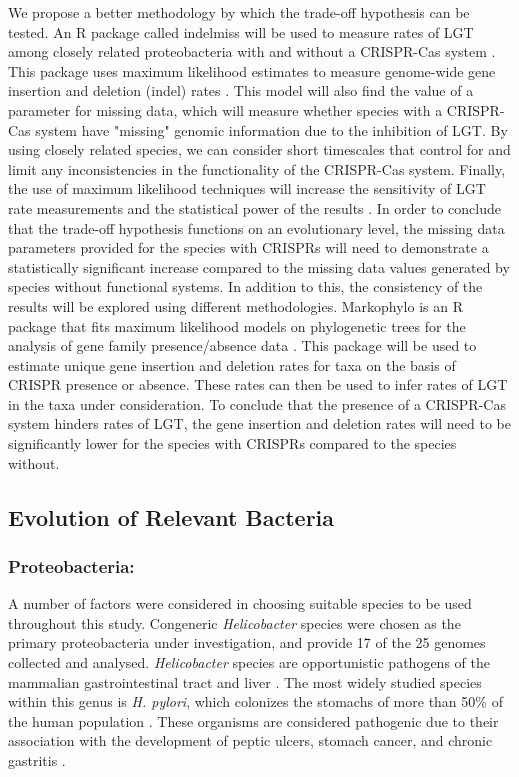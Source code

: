 \documentclass[english]{article}
\begin{document}
We propose a better methodology by which the trade-off hypothesis can
be tested. An R package called indelmiss will be used to measure rates
of LGT among closely related proteobacteria with and without a
CRISPR-Cas system \citep{Dang:15}. This package uses maximum likelihood estimates to
measure genome-wide gene insertion and deletion (indel) rates
\citep{Dang:15}. This
model will also find the value of a parameter for missing data, which
will measure whether species with a CRISPR-Cas system have "missing"
genomic information due to the inhibition of LGT. By using closely
related species, we can consider short timescales that control for and
limit any inconsistencies in the functionality of the CRISPR-Cas
system. Finally, the use of maximum likelihood techniques will
increase the sensitivity of LGT rate measurements and the statistical
power of the results \citep{Dang:15}. In order to conclude that the trade-off
hypothesis functions on an evolutionary level, the missing data
parameters provided for the species with CRISPRs will need to
demonstrate a statistically significant increase compared to the
missing data values generated by species without functional systems. 
In addition to this, the consistency of the results will be explored
 using different methodologies. Markophylo is an R package that fits
maximum likelihood models on phylogenetic trees for the analysis of
gene family presence/absence data \citep{Dang2:15}. This package will be used to
estimate unique gene insertion and deletion rates for taxa on the
basis of CRISPR presence or absence. These rates can then be used to
infer rates of LGT in the taxa under consideration. To conclude that
the presence of a CRISPR-Cas system hinders rates of LGT, the gene
insertion and deletion rates will need to be significantly lower for
the species with CRISPRs compared to the species without. 

\subsection{Evolution of Relevant Bacteria}
\subsubsection{Proteobacteria:}

A number of factors were considered in choosing suitable species to be
used throughout this study. Congeneric \textit{Helicobacter} species were
chosen as the primary proteobacteria under investigation, and provide
17 of the 25 genomes collected and analysed. \textit{Helicobacter} species are
opportunistic pathogens of the mammalian gastrointestinal tract and
liver \citep{Suer:07}. The most widely studied species within this genus is \textit{H.
pylori}, which colonizes the stomachs of more than 50\% of the human
population \citep{Suer:07}. These organisms are considered pathogenic due to their
association with the development of peptic ulcers, stomach cancer, and
chronic gastritis \citep{Suer:07}. 
\end{document}
